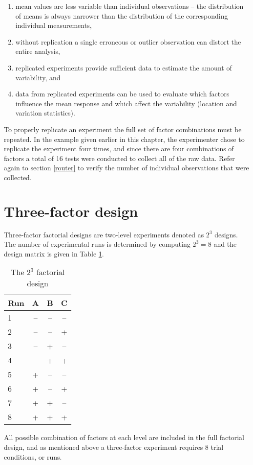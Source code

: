 \begin{enumerate}
\item mean values are less variable than individual observations -- the distribution of means is always narrower than the distribution of the corresponding individual measurements,
\item without replication a single erroneous or outlier observation can distort the entire analysis,
\item replicated experiments provide sufficient data to estimate the amount of variability, and
\item data from replicated experiments can be used to evaluate which factors influence the mean response and which affect the variability (location and variation statistics).
\end{enumerate}

To properly replicate an experiment the full set of factor combinations must be repeated.  In the example given earlier in this chapter, the experimenter chose to replicate the experiment four times, and since there are four combinations of factors a total of 16 tests were conducted to collect all of the raw data.  Refer again to section \ref{router} to verify the number of individual observations that were collected.

\section{Three-factor design}
Three-factor factorial designs are two-level experiments denoted as $ 2^{3} $ designs. The number of experimental runs is determined by computing $ 2^{3} = 8 $ and the design matrix is given in Table \ref{tab4}.
\begin{table}[h]\caption{The $2^{3}$ factorial design}\label{tab4}
\begin{center}
\begin{tabular}{|l|c|c|c|}
\hline Run & A & B & C\\ 
\hline 1 & -- & -- & --\\ 
\hline 2 & -- & -- & \cellcolor{black!95}+\\ 
\hline 3 & -- & \cellcolor{black!95}+ & --\\ 
\hline 4 & -- & \cellcolor{black!95}+ & \cellcolor{black!95}+\\
\hline 5 & \cellcolor{black!95}+ & -- & --\\
\hline 6 & \cellcolor{black!95}+ & -- & \cellcolor{black!95}+\\
\hline 7 & \cellcolor{black!95}+ & \cellcolor{black!95}+ & --\\
\hline 8 & \cellcolor{black!95}+ & \cellcolor{black!95}+ & \cellcolor{black!95}+\\ 
\hline 
\end{tabular} 
\end{center}
\end{table}
All possible combination of factors at each level are included in the full factorial design, and as mentioned above  a three-factor experiment requires 8 trial conditions, or runs.  

